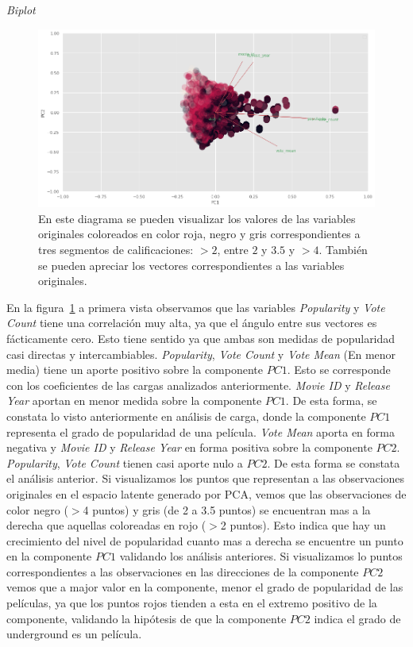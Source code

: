 \documentclass[11pt,a4paper,twoside]{thesis}
\begin{document}
\clearpage

\begin{description}
	\item[\textit{Biplot}]
\end{description}

\begin{figure}[h!]
	\centering
	\includegraphics[width=15cm]{./images/PCA-biplot.png}
	\caption{En este diagrama se pueden visualizar los valores de las variables originales coloreados en color roja, negro y gris correspondientes a tres segmentos de calificaciones: $>2$, entre $2$ y $3.5$ y $>4$. También se pueden apreciar los vectores correspondientes a las variables originales.}
	\label{fig:biplot}
\end{figure}

En la figura~\ref{fig:biplot} a primera vista observamos que las variables
\textit{Popularity} y \textit{Vote Count} tiene una correlación muy alta, ya
que el ángulo entre sus vectores es fácticamente cero. Esto tiene sentido ya
que ambas son medidas de popularidad casi directas y intercambiables.
\textit{Popularity}, \textit{Vote Count} y \textit{Vote Mean} (En menor media)
tiene un aporte positivo sobre la componente $PC1$. Esto se corresponde con los
coeficientes de las cargas analizados anteriormente. \textit{Movie ID } y
\textit{Release Year} aportan en menor medida sobre la componente $PC1$. De
esta forma, se constata lo visto anteriormente en análisis de carga, donde la
componente $PC1$ representa el grado de popularidad de una película.
\textit{Vote Mean} aporta en forma negativa y \textit{Movie ID } y
\textit{Release Year} en forma positiva sobre la componente $PC2$.
\textit{Popularity}, \textit{Vote Count} tienen casi aporte nulo a $PC2$. De
esta forma se constata el análisis anterior. Si visualizamos los puntos que
representan a las observaciones originales en el espacio latente generado por
PCA, vemos que las observaciones de color negro ($>$4 puntos) y gris (de 2 a
3.5 puntos) se encuentran mas a la derecha que aquellas coloreadas en rojo
($>$2 puntos). Esto indica que hay un crecimiento del nivel de popularidad
cuanto mas a derecha se encuentre un punto en la componente $PC1$ validando los
análisis anteriores. Si visualizamos lo puntos correspondientes a las
observaciones en las direcciones de la componente $PC2$ vemos que a major valor
en la componente, menor el grado de popularidad de las películas, ya que los
puntos rojos tienden a esta en el extremo positivo de la componente, validando
la hipótesis de que la componente $PC2$ indica el grado de underground es un
película.
\end{document}
